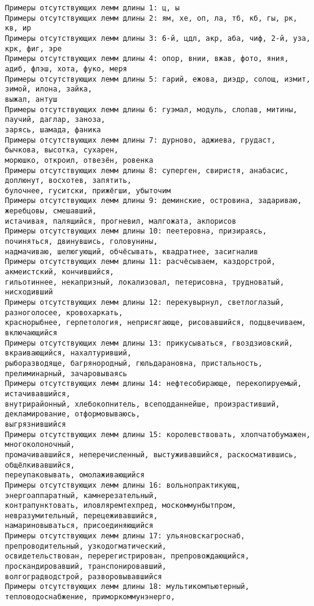 \documentclass[11pt]{article}
\begin{document}
    \begin{Verbatim}[commandchars=\\\{\}]
Примеры отсутствующих лемм длины 1: ц, ы
Примеры отсутствующих лемм длины 2: ям, хе, оп, ла, тб, кб, гы, рк, кв, ир
Примеры отсутствующих лемм длины 3: 6-й, цдл, акр, аба, чиф, 2-й, уза, крк, фиг, эре
Примеры отсутствующих лемм длины 4: опор, внии, вжав, фото, яния, адиб, флэш, хота, фуко, меря
Примеры отсутствующих лемм длины 5: гарий, ежова, диэдр, солощ, измит, зимой, илона, зайка,
выжал, антуш
Примеры отсутствующих лемм длины 6: гуэмал, модуль, слопав, митины, паучий, даглар, заноза,
зарясь, шамада, фаника
Примеры отсутствующих лемм длины 7: дурново, аджиева, грудаст, бычкова, высотка, сухарен,
морюшко, откроил, отвезён, ровенка
Примеры отсутствующих лемм длины 8: суперген, свиристя, анабасис, доплюнут, восхотев, запятить,
булочнее, гуситски, прижёгши, убыточим
Примеры отсутствующих лемм длины 9: деминские, островина, задариваю, жеребцовы, смешавший,
истачивая, палящийся, прогневил, малгожата, акпорисов
Примеры отсутствующих лемм длины 10: пеетеровна, призираясь, починяться, двинувшись, головунины,
надмачиваю, шелюгующий, обчёсывать, квадратнее, засигналив
Примеры отсутствующих лемм длины 11: расчёсываем, каздорстрой, акмеистский, кончившийся,
гильотиннее, некапризный, локализовал, петерисовна, трудноватый, нисходивший
Примеры отсутствующих лемм длины 12: перекувырнул, светлоглазый, разноголосее, кровохаркать,
краснорыбнее, герпетология, неприсягающе, рисовавшийся, подцвечиваем, включающийся
Примеры отсутствующих лемм длины 13: прикусываться, гвоздзиовский, вкраивающийся, нахалтуривший,
рыборазводяще, багрянородный, гюльдарановна, пристальность, прелиминарный, зачаровываясь
Примеры отсутствующих лемм длины 14: нефтесобирающе, перекопируемый, истачивавшийся,
внутрирайонный, хлебокопнитель, всеподданнейше, произрастивший, декламирование, отформовываюсь,
выгрязнившийся
Примеры отсутствующих лемм длины 15: королевствовать, хлопчатобумажен, многоколоночный,
промачивавшийся, неперечисленный, выстуживавшийся, раскосматившись, общёлкивавшийся,
переупаковывать, омолаживающийся
Примеры отсутствующих лемм длины 16: вольнопрактикующ, энергоаппаратный, камнерезательный,
контрапунктовать, иловляремтехпред, москоммунбытпром, невразумительный, перецеживавшийся,
намариновываться, присоединяющийся
Примеры отсутствующих лемм длины 17: ульяновскагроснаб, препроводительный, узкодогматический,
освидетельствован, перерегистрирован, препровождающийся, проскандировавший, транспонировавший,
волгоградводстрой, разворовывавшийся
Примеры отсутствующих лемм длины 18: мультикомпьютерный, тепловодоснабжение, приморкоммунэнерго,

\end{Verbatim}
\end{document}
